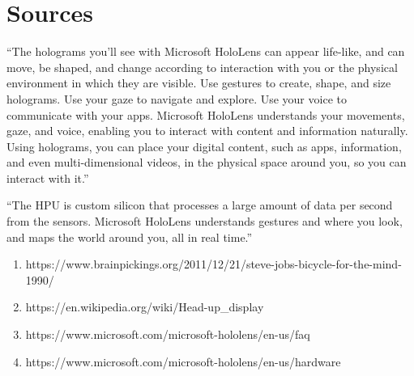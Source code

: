\documentclass[a4paper,12pt]{article}
\begin{document}
\section{Sources}

``The holograms you'll see with Microsoft HoloLens can appear life-like, and can move, be shaped, and change according to interaction with you or the physical environment in which they are visible. Use gestures to create, shape, and size holograms. Use your gaze to navigate and explore. Use your voice to communicate with your apps. Microsoft HoloLens understands your movements, gaze, and voice, enabling you to interact with content and information naturally. Using holograms, you can place your digital content, such as apps, information, and even multi-dimensional videos, in the physical space around you, so you can interact with it.''

``The HPU is custom silicon that processes a large amount of data per second from the sensors. Microsoft HoloLens understands gestures and where you look, and maps the world around you, all in real time.''
\begin{enumerate}
    \item https://www.brainpickings.org/2011/12/21/steve-jobs-bicycle-for-the-mind-1990/
    \item https://en.wikipedia.org/wiki/Head-up\_display
	\item https://www.microsoft.com/microsoft-hololens/en-us/faq
	\item https://www.microsoft.com/microsoft-hololens/en-us/hardware
\end{enumerate}
\end{document}
